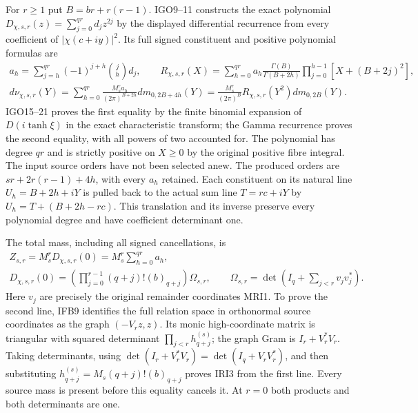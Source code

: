 For $r\ge1$ put $B=br+r(r-1)$. IGO9--11 constructs the exact
polynomial $D_{\chi,s,r}(z)=\sum_{j=0}^{qr}d_jz^{2j}$ by the
displayed differential recurrence from every coefficient of
$|\chi(c+iy)|^2$. Its full signed constituent and positive
polynomial formulas are
\[
\begin{gathered}
 a_h=\sum_{j=h}^{qr}(-1)^{j+h}\binom jh d_j,\qquad
 R_{\chi,s,r}(X)=\sum_{h=0}^{qr}a_h
       \frac{\Gamma(B)}{\Gamma(B+2h)}
       \prod_{j=0}^{h-1}[X+(B+2j)^2],\\
 d\nu_{\chi,s,r}(Y)
 =\sum_{h=0}^{qr}\frac{M_s^ra_h}{(2\pi)^{B+2h}}
                             dm_{0,2B+4h}(Y)
 =\frac{M_s^r}{(2\pi)^B}
                  R_{\chi,s,r}(Y^2)dm_{0,2B}(Y).
\end{gathered}\tag{IRI2}
\]
IGO15--21 proves the first equality by the finite binomial expansion
of $D(i\tanh\xi)$ in the exact characteristic transform; the Gamma
recurrence proves the second equality, with all powers of two
accounted for. The polynomial has degree $qr$ and is strictly
positive on $X\ge0$ by the original positive fibre integral.
The input source orders have not been selected anew. The produced
orders are $sr+2r(r-1)+4h$, with every $a_h$ retained. Each
constituent on its natural line $U_h=B+2h+iY$ is pulled back to
the actual sum line $T=rc+iY$ by
$U_h=T+(B+2h-rc)$. This translation and its inverse preserve every
polynomial degree and have coefficient determinant one.

The total mass, including all signed cancellations, is
\[
\begin{gathered}
 Z_{s,r}=M_s^rD_{\chi,s,r}(0)
        =M_s^r\sum_{h=0}^{qr}a_h,\\
 D_{\chi,s,r}(0)
   =\left(\prod_{j=0}^{r-1}(q+j)!(b)_{q+j}\right)\Omega_{s,r},
 \qquad
 \Omega_{s,r}=\det\left(I_q+\sum_{j<r}v_jv_j^*\right).
\end{gathered}\tag{IRI3}
\]
Here $v_j$ are precisely the original remainder coordinates MRI1.
To prove the second line, IFB9 identifies the full relation space
in orthonormal source coordinates as the graph $(-V_rz,z)$.
Its monic high-coordinate matrix is triangular with squared
determinant $\prod_{j<r}h_{q+j}^{(s)}$; the graph Gram is
$I_r+V_r^*V_r$. Taking determinants, using
$\det(I_r+V_r^*V_r)=\det(I_q+V_rV_r^*)$, and then substituting
$h_{q+j}^{(s)}=M_s(q+j)!(b)_{q+j}$ proves IRI3 from the first
line. Every source mass is present before this equality cancels it.
At $r=0$ both products and both determinants are one.


